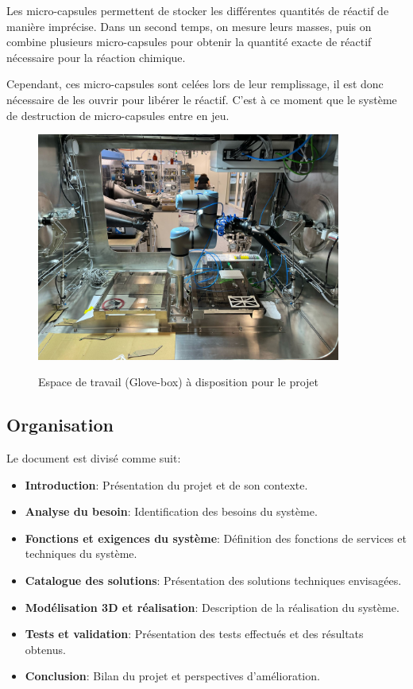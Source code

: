 \vspace{0.3cm}
Les micro-capsules permettent de stocker les différentes quantités de réactif de manière imprécise. Dans un second temps, on mesure leurs masses, puis on combine plusieurs micro-capsules pour obtenir la quantité exacte de réactif nécessaire pour la réaction chimique.

\vspace{0.3cm}
Cependant, ces micro-capsules sont celées lors de leur remplissage, il est donc nécessaire de les ouvrir pour libérer le réactif. C'est à ce moment que le système de destruction de micro-capsules entre en jeu.

\begin{figure}[H]
    \centering
    \includegraphics[width=10cm]{Images/Illustrations/Intro/Photo_glove_box.jpg}
    \label{fig:photo-boxe}
    \caption{Espace de travail (Glove-box) à disposition pour le projet}
\end{figure}
\subsection{Organisation}
Le document est divisé comme suit:
\begin{itemize}[label=\textbullet]
    \item \textbf{Introduction}: Présentation du projet et de son contexte.
    \item \textbf{Analyse du besoin}: Identification des besoins du système.
    \item \textbf{Fonctions et exigences du système}: Définition des fonctions de services et techniques du système.
    \item \textbf{Catalogue des solutions}: Présentation des solutions techniques envisagées.
    \item \textbf{Modélisation 3D et réalisation}: Description de la réalisation du système.
    \item \textbf{Tests et validation}: Présentation des tests effectués et des résultats obtenus.
    \item \textbf{Conclusion}: Bilan du projet et perspectives d'amélioration.
\end{itemize}
\newpage